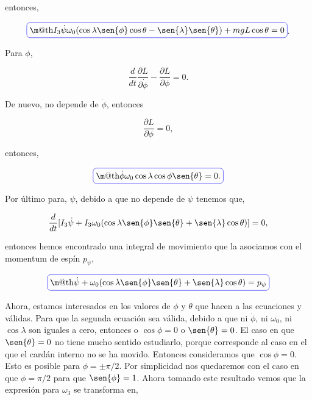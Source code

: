 \documentclass[a4paper,10pt]{article}
\makeatletter
\numberwithin{equation}{section}
\newcommand*{\boxcolor}{blue}
\renewcommand{\boxed}[1]{\textcolor{\boxcolor}{%
\tikz[baseline={([yshift=-1ex]current bounding box.center)}] \node [rectangle, minimum width=1ex,rounded corners,draw] {\normalcolor\m@th$\displaystyle#1$};}}
\makeatother
\begin{document}
entonces,

\begin{equation}
 \boxed{I_3\dot{\psi}\omega_0(\cos{\lambda}\sen{\phi}\cos{\theta} - \sen{\lambda}\sen{\theta}) 
 + mgL\cos{\theta} = 0}.
 \label{eq:movimientoTheta}
\end{equation}

Para $\phi$, 

\begin{equation}
 \frac{d}{dt}\frac{\partial L}{\partial \dot{\phi}} - \frac{\partial L}{\partial \phi} = 0.
\end{equation}

De nuevo,  no depende de $\dot{\phi}$, entonces 

\begin{equation}
 \frac{\partial L}{\partial \phi} = 0,
\end{equation}

entonces,

\begin{equation}
 \boxed{\dot{\phi}\omega_0\cos{\lambda}\cos{\phi}\sen{\theta} = 0.}
 \label{eq:movimientoPhi}
\end{equation}

Por último para, $\psi$, debido a que  no depende 
de $\psi$ tenemos que,

\begin{equation}
 \frac{d}{dt}[I_3\dot{\psi} + I_3\omega_0(\cos{\lambda}\sen{\phi}\sen{\theta} + 
 \sen{\lambda}\cos{\theta})] = 0,
\end{equation}

entonces hemos encontrado una integral de movimiento que la asociamos con el momentum 
de espín $p_{\psi}$,

\begin{equation}
 \boxed{\dot{\psi} + \omega_0(\cos{\lambda}\sen{\phi}\sen{\theta}+ 
 \sen{\lambda}\cos{\theta}) = p_{\psi}}
 \label{eq:movimientoPsi}
\end{equation}

Ahora, estamos interesados en los valores de $\phi$ y $\theta$ que hacen a las ecuaciones
 y  válidas. Para que la segunda ecuación sea 
válida, debido a que ni $\dot{\phi}$, ni $\omega_0$, ni $\cos{\lambda}$ son iguales a
cero, entonces o $\cos{\phi} = 0$ o $\sen{\theta} = 0$. El caso en que $\sen{\theta} = 0$ 
no tiene mucho sentido estudiarlo, porque corresponde al caso en el que el cardán interno no se 
ha movido. Entonces consideramos que $\cos{\phi}= 0$. Esto es posible para $\phi= \pm \pi/2$. Por 
simplicidad nos quedaremos con el caso en que $\phi = \pi/2$ para que $\sen{\phi} = 1$. Ahora 
tomando este resultado vemos que la expresión para $\omega_3$ se transforma en,
\end{document}
